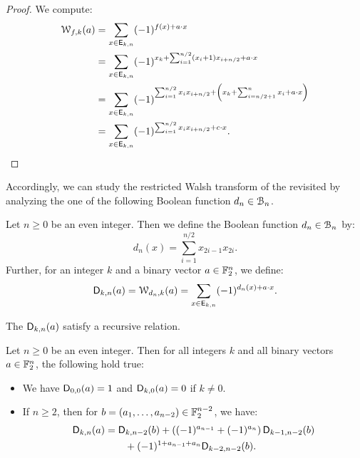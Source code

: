 \documentclass{llncs}
\begin{document}
\begin{proof}
	We compute:
	\begin{align*}
		\wtk{f}{k}(a)&=\sum_{x \in \Ekn{k}{n}} (-1)^{f(x)+a \cdot x}\\
		&=\sum_{x \in \Ekn{k}{n}} (-1)^{x_k + \sum_{i=1}^{n/2} (x_i+1) x_{i+n/2}+ a \cdot x}\\
		&=\sum_{x \in \Ekn{k}{n}} (-1)^{\sum_{i=1}^{n/2} x_i x_{i+n/2}+\left(x_k+\sum_{i=n/2+1}^{n}x_i+a\cdot x\right)}\\
		&=\sum_{x \in \Ekn{k}{n}} (-1)^{\sum_{i=1}^{n/2} x_i x_{i+n/2}+ c \cdot x}.\qedhere
	\end{align*}
\end{proof}

Accordingly, we can study the restricted Walsh transform of the revisited \hwbf{} by analyzing the one of the following Boolean function $d_n\in\BN$.

\begin{definition}
	Let $n\geq 0$ be an even integer. Then we define the Boolean function $d_n\in\BN$ by:
	\[
		d_n(x)=\sum_{i=1}^{n/2}x_{2i-1}x_{2i}.
	\]
	Further, for an integer $k$ and a binary vector $a\in\F_2^n$, we define:
	\[
		\Dnka{n}{k}{a}=\wtk{d_n}{k}(a)=\sum_{x\in \Ekn{k}{n}} (-1)^{d_n(x) +a\cdot x}.
	\]
\end{definition}

The $\Dnka{n}{k}{a}$ satisfy a recursive relation.

\begin{proposition}\label{prop:recursiveDnka}
Let $n\geq 0$ be an even integer. Then for all integers $k$ and all binary vectors $a\in\F_2^n$, the following hold true:
	\begin{itemize}
		\item We have $\Dnka 00a=1$ and $\Dnka 0ka=0$ if $k\neq 0$.
		\item If $n\geq 2$, then for $b=(a_1,\dots,a_{n-2})\in\F_2^{n-2}$, we have:
		\begin{align*}
			\Dnka{n}{k}{a}&=\Dnka{n-2}{k}{b}+\left((-1)^{a_{n-1}} + (-1)^{a_{n}}\right)\Dnka{n-2}{k-1}{b}\\
			&\qquad+ (-1)^{1+a_{n-1}+a_n} \Dnka{n-2}{k-2}{b}.
		\end{align*}
	\end{itemize}
\end{proposition}
\end{document}
